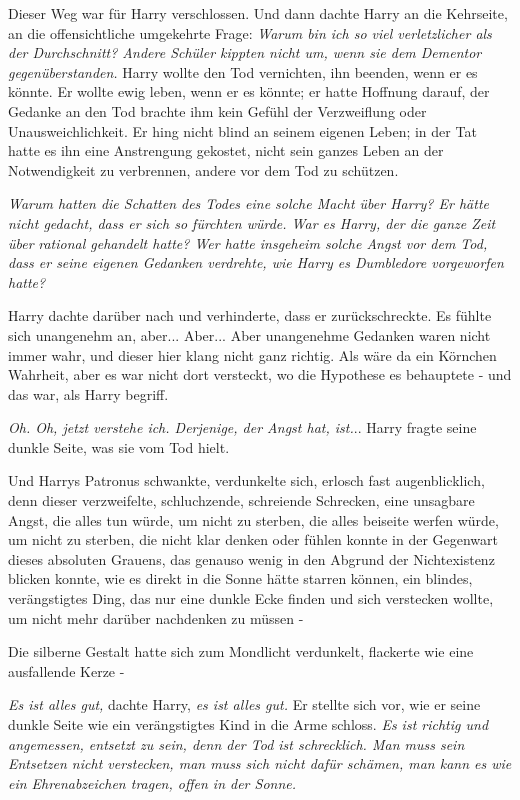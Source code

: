 Dieser Weg war für Harry verschlossen. Und dann dachte Harry an die Kehrseite,
an die offensichtliche umgekehrte Frage: \emph{Warum bin ich so viel
verletzlicher als der Durchschnitt? Andere Schüler kippten nicht um, wenn sie
dem Dementor gegenüberstanden.} Harry wollte den Tod vernichten, ihn beenden,
wenn er es könnte. Er wollte ewig leben, wenn er es könnte; er hatte Hoffnung
darauf, der Gedanke an den Tod brachte ihm kein Gefühl der Verzweiflung oder
Unausweichlichkeit. Er hing nicht blind an seinem eigenen Leben; in der Tat
hatte es ihn eine Anstrengung gekostet, nicht sein ganzes Leben an der
Notwendigkeit zu verbrennen, andere vor dem Tod zu schützen.

\emph{Warum hatten die Schatten des Todes eine solche Macht über Harry? Er hätte
nicht gedacht, dass er sich so fürchten würde. War es Harry, der die ganze Zeit
über }\emph{rational gehandelt hatte? Wer hatte insgeheim solche Angst vor dem
Tod, dass er seine eigenen Gedanken verdrehte, wie Harry es Dumbledore
vorgeworfen hatte?}

Harry dachte darüber nach und verhinderte, dass er zurückschreckte. Es fühlte
sich unangenehm an, aber... Aber... Aber unangenehme Gedanken waren nicht immer
wahr, und dieser hier klang nicht ganz richtig. Als wäre da ein Körnchen
Wahrheit, aber es war nicht dort versteckt, wo die Hypothese es behauptete - und
das war, als Harry begriff.

\emph{Oh. Oh, jetzt verstehe ich. Derjenige, der Angst hat, ist.}.. Harry fragte
seine dunkle Seite, was sie vom Tod hielt.

Und Harrys Patronus schwankte, verdunkelte sich, erlosch fast augenblicklich,
denn dieser verzweifelte, schluchzende, schreiende Schrecken, eine unsagbare
Angst, die alles tun würde, um nicht zu sterben, die alles beiseite werfen
würde, um nicht zu sterben, die nicht klar denken oder fühlen konnte in der
Gegenwart dieses absoluten Grauens, das genauso wenig in den Abgrund der
Nichtexistenz blicken konnte, wie es direkt in die Sonne hätte starren können,
ein blindes, verängstigtes Ding, das nur eine dunkle Ecke finden und sich
verstecken wollte, um nicht mehr darüber nachdenken zu müssen -

Die silberne Gestalt hatte sich zum Mondlicht verdunkelt, flackerte wie eine
ausfallende Kerze -

\emph{Es ist alles gut,} dachte Harry,\emph{ es ist alles gut.} Er stellte sich
vor, wie er seine dunkle Seite wie ein verängstigtes Kind in die Arme schloss.
\emph{Es ist richtig und angemessen, entsetzt zu sein, denn der Tod ist schrecklich. Man muss sein Entsetzen nicht verstecken, man muss sich nicht dafür schämen, man kann es wie ein Ehrenabzeichen tragen, offen in der Sonne.}

